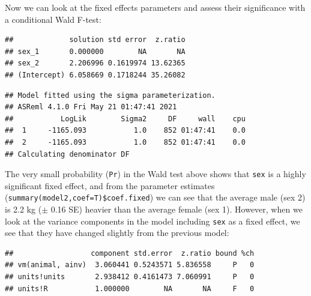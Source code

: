 \documentclass[
  12pt,
]{book}
\newenvironment{Shaded}{\begin{snugshade}}{\end{snugshade}}
\newcommand{\AttributeTok}[1]{\textcolor[rgb]{0.77,0.63,0.00}{#1}}
\newcommand{\ConstantTok}[1]{\textcolor[rgb]{0.00,0.00,0.00}{#1}}
\newcommand{\FunctionTok}[1]{\textcolor[rgb]{0.00,0.00,0.00}{#1}}
\newcommand{\NormalTok}[1]{#1}
\newcommand{\SpecialCharTok}[1]{\textcolor[rgb]{0.00,0.00,0.00}{#1}}
\newcommand{\StringTok}[1]{\textcolor[rgb]{0.31,0.60,0.02}{#1}}
\begin{document}
Now we can look at the fixed effects parameters and assess their significance with a conditional Wald F-test:

\begin{Shaded}
\end{Shaded}

\begin{verbatim}
##             solution std error  z.ratio
## sex_1       0.000000        NA       NA
## sex_2       2.206996 0.1619974 13.62365
## (Intercept) 6.058669 0.1718244 35.26082
\end{verbatim}

\begin{verbatim}
## Model fitted using the sigma parameterization.
## ASReml 4.1.0 Fri May 21 01:47:41 2021
##           LogLik        Sigma2     DF     wall    cpu
##  1     -1165.093           1.0    852 01:47:41    0.0
##  2     -1165.093           1.0    852 01:47:41    0.0
## Calculating denominator DF
\end{verbatim}

The very small probability (\texttt{Pr}) in the Wald test above shows that \texttt{sex} is a highly significant fixed effect, and from the parameter estimates (\texttt{summary(model2,coef=T)\$coef.fixed}) we can see that the average male (sex 2) is 2.2 kg (\(\pm\) 0.16 SE) heavier than the average female (sex 1). However, when we look at the variance components in the model including \texttt{sex} as a fixed effect, we see that they have changed slightly from the previous model:

\begin{Shaded}
\end{Shaded}

\begin{verbatim}
##                  component std.error  z.ratio bound %ch
## vm(animal, ainv)  3.060441 0.5243571 5.836558     P   0
## units!units       2.938412 0.4161473 7.060991     P   0
## units!R           1.000000        NA       NA     F   0
\end{verbatim}
\end{document}
